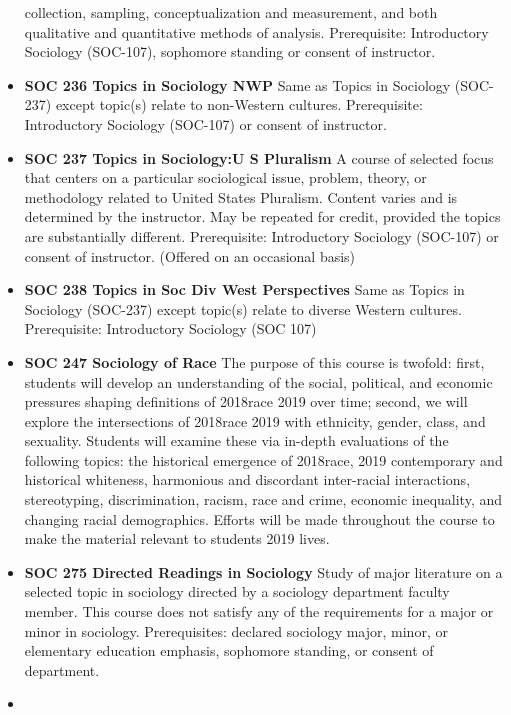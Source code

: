 \documentclass[
  letterpaper,
]{scrbook}
\begin{document}
\begin{itemize}
  collection, sampling, conceptualization and measurement, and both
  qualitative and quantitative methods of analysis. Prerequisite:
  Introductory Sociology (SOC-107), sophomore standing or consent of
  instructor.\\
\item
  \textbf{SOC 236 Topics in Sociology NWP} Same as Topics in Sociology
  (SOC-237) except topic(s) relate to non-Western cultures.
  Prerequisite: Introductory Sociology (SOC-107) or consent of
  instructor.
\item
  \textbf{SOC 237 Topics in Sociology:U S Pluralism} A course of
  selected focus that centers on a particular sociological issue,
  problem, theory, or methodology related to United States Pluralism.
  Content varies and is determined by the instructor. May be repeated
  for credit, provided the topics are substantially different.
  Prerequisite: Introductory Sociology (SOC-107) or consent of
  instructor. (Offered on an occasional basis)\\
\item
  \textbf{SOC 238 Topics in Soc Div West Perspectives} Same as Topics in
  Sociology (SOC-237) except topic(s) relate to diverse Western
  cultures. Prerequisite: Introductory Sociology (SOC 107)
\item
  \textbf{SOC 247 Sociology of Race} The purpose of this course is
  twofold: first, students will develop an understanding of the social,
  political, and economic pressures shaping definitions of 2018race 2019
  over time; second, we will explore the intersections of 2018race 2019
  with ethnicity, gender, class, and sexuality. Students will examine
  these via in-depth evaluations of the following topics: the historical
  emergence of 2018race, 2019 contemporary and historical whiteness,
  harmonious and discordant inter-racial interactions, stereotyping,
  discrimination, racism, race and crime, economic inequality, and
  changing racial demographics. Efforts will be made throughout the
  course to make the material relevant to students 2019 lives.
\item
  \textbf{SOC 275 Directed Readings in Sociology} Study of major
  literature on a selected topic in sociology directed by a sociology
  department faculty member. This course does not satisfy any of the
  requirements for a major or minor in sociology. Prerequisites:
  declared sociology major, minor, or elementary education emphasis,
  sophomore standing, or consent of department.\\
\item

\end{itemize}
\end{document}

